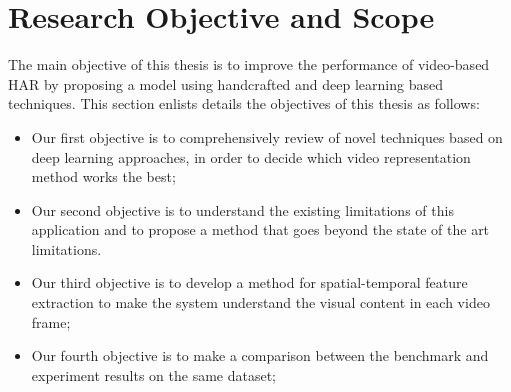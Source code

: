 \section{Research Objective and Scope}
\hspace{5mm} The main objective of this thesis is to improve the performance of video-based HAR by proposing a model using handcrafted and deep learning based techniques. This section enlists details the objectives of this thesis as follows:
\begin{itemize}
    \item Our first objective is to comprehensively review of novel techniques based on deep learning approaches, in order to decide which video representation method works the best;
    \item Our second objective is to understand the existing limitations of this application and to propose a method that goes beyond the state of the art limitations.
    \item Our third objective is to develop a method for spatial-temporal feature extraction to make the system understand the visual content in each video frame;
    \item Our fourth objective is to make a comparison between the benchmark and experiment results on the same dataset;
\end{itemize}

